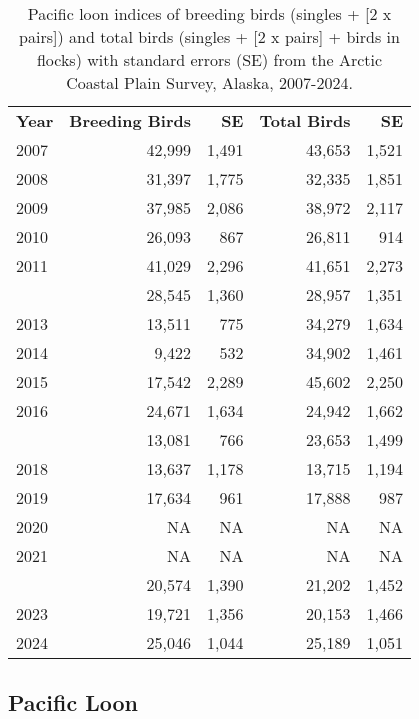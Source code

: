\documentclass[
]{article}
\begin{document}
\begin{longtable}[t]{lrrrr}

\caption{\label{tbl-PALO}Pacific loon indices of breeding birds (singles
+ {[}2 x pairs{]}) and total birds (singles + {[}2 x pairs{]} + birds in
flocks) with standard errors (SE) from the Arctic Coastal Plain Survey,
Alaska, 2007-2024.}

\tabularnewline

\\
\toprule
\textbf{Year} & \textbf{Breeding Birds} & \textbf{SE} & \textbf{Total Birds} & \textbf{SE}\\
\midrule
2007 & 42,999 & 1,491 & 43,653 & 1,521\\
2008 & 31,397 & 1,775 & 32,335 & 1,851\\
2009 & 37,985 & 2,086 & 38,972 & 2,117\\
2010 & 26,093 & 867 & 26,811 & 914\\
2011 & 41,029 & 2,296 & 41,651 & 2,273\\
\addlinespace
2012 & 28,545 & 1,360 & 28,957 & 1,351\\
2013 & 13,511 & 775 & 34,279 & 1,634\\
2014 & 9,422 & 532 & 34,902 & 1,461\\
2015 & 17,542 & 2,289 & 45,602 & 2,250\\
2016 & 24,671 & 1,634 & 24,942 & 1,662\\
\addlinespace
2017 & 13,081 & 766 & 23,653 & 1,499\\
2018 & 13,637 & 1,178 & 13,715 & 1,194\\
2019 & 17,634 & 961 & 17,888 & 987\\
2020 & NA & NA & NA & NA\\
2021 & NA & NA & NA & NA\\
\addlinespace
2022 & 20,574 & 1,390 & 21,202 & 1,452\\
2023 & 19,721 & 1,356 & 20,153 & 1,466\\
2024 & 25,046 & 1,044 & 25,189 & 1,051\\
\bottomrule

\end{longtable}

\endgroup{}

\newpage{}

\subsection*{Pacific Loon}\label{pacific-loon-2}
\end{document}
